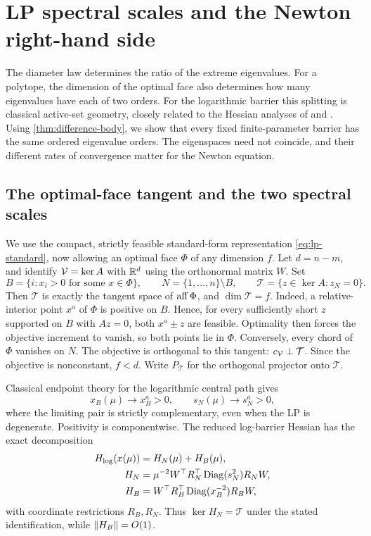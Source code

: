 \section{LP spectral scales and the Newton right-hand side}
\label{sec:lp-spectra}

The diameter law determines the ratio of the extreme eigenvalues. For
a polytope, the dimension of the optimal face also determines how many
eigenvalues have each of two orders. For the logarithmic barrier this
splitting is classical active-set geometry, closely related to the
Hessian analyses of \citet{wright1994} and \citet{forsgren2002}. Using
\cref{thm:difference-body}, we show that every fixed finite-parameter
barrier has the same ordered eigenvalue orders. The eigenspaces need not
coincide, and their different rates of convergence matter for the
Newton equation.

\subsection{The optimal-face tangent and the two spectral scales}

We use the compact, strictly feasible standard-form representation
\eqref{eq:lp-standard}, now allowing an optimal face $\Phi$ of any
dimension $f$. Let $d=n-m$, and identify $\mathcal V=\ker A$ with $\mathbb R^d$ using
the orthonormal matrix $W$. Set
\[
 B=\{i:x_i>0\text{ for some }x\in\Phi\},\qquad
 N=\{1,\ldots,n\}\setminus B,\qquad
 \mathcal T=\{z\in\ker A:z_N=0\}.
\]
Then $\mathcal T$ is exactly the tangent space of $\operatorname{aff}\Phi$, and
$\dim\mathcal T=f$. Indeed, a relative-interior point $x^a$ of $\Phi$
is positive on $B$. Hence, for every sufficiently short
$z$ supported on $B$ with $Az=0$, both $x^a\pm z$ are
feasible. Optimality then forces the objective increment to vanish, so
both points lie in $\Phi$. Conversely, every chord of $\Phi$ vanishes
on $N$. The objective is orthogonal to this tangent:
$c_{\mathcal V}\perp\mathcal T$. Since the objective is nonconstant, $f<d$.
Write $P_{\mathcal T}$ for the orthogonal projector onto $\mathcal T$.

Classical endpoint theory for the logarithmic central path
\citep{adler1991,guler1994,halicka1999} gives
\begin{equation}
 x_B(\mu)\longrightarrow x_B^a>0,\qquad
 s_N(\mu)\longrightarrow s_N^a>0,
 \label{eq:lp-face-endpoints}
\end{equation}
where the limiting pair is strictly complementary, even when the LP is
degenerate. Positivity is componentwise. The reduced log-barrier Hessian
has the exact decomposition
\begin{equation}
 \begin{aligned}
 H_{\log}(x(\mu))&=H_N(\mu)+H_B(\mu),\\
 H_N&=\mu^{-2}W^\top R_N^\top\operatorname{Diag}(s_N^2)R_NW,\\
 H_B&=W^\top R_B^\top\operatorname{Diag}(x_B^{-2})R_BW,
 \end{aligned}
 \label{eq:lp-hard-soft}
\end{equation}
with coordinate restrictions $R_B,R_N$. Thus $\ker H_N=\mathcal T$
under the stated identification, while $\left\lVert H_B\right\rVert=O(1)$.

